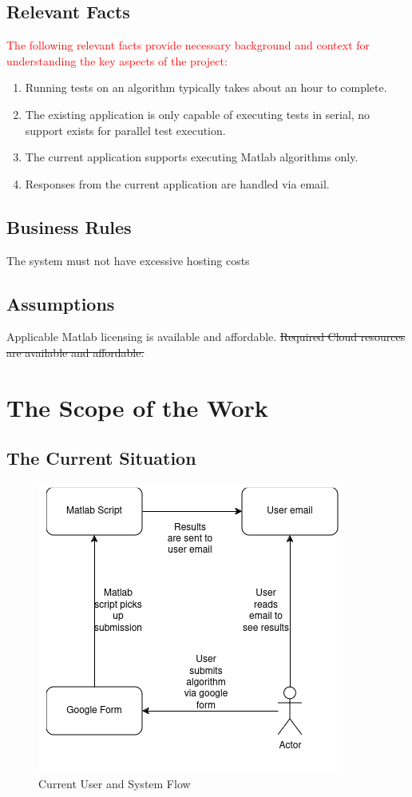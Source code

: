 \documentclass[12pt]{article}
\begin{document}
\subsection{Relevant Facts}
\textcolor{red}{The following relevant facts provide necessary background and context for understanding the key aspects of the project:}
\begin{enumerate}
\item Running tests on an algorithm typically takes about an hour to complete.
\item The existing application is only capable of executing tests in serial, no support exists for parallel test execution.
\item The current application supports executing Matlab algorithms only.
\item Responses from the current application are handled via email.
\end{enumerate}
\subsection{Business Rules}
    The system must not have excessive hosting costs
\subsection{Assumptions}
    Applicable Matlab licensing is available and affordable. \sout{Required Cloud resources are available and affordable.}
\section{The Scope of the Work}
\subsection{The Current Situation}
\begin{figure}[H]
    \centering
    \includegraphics[width=1\linewidth]{diagrams/currentstate.png}
    \caption{Current User and System Flow}
\end{figure}
\end{document}
